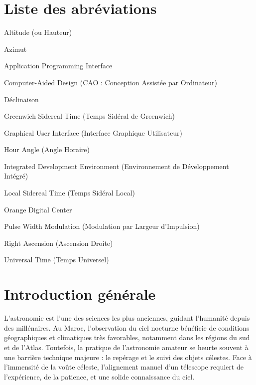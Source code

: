 \documentclass[12pt,a4paper]{report}
\begin{document}
\chapter*{Liste des abréviations}
\begin{description}[font=\bfseries, labelwidth=2.5cm, leftmargin=3cm]
    \item[Alt] Altitude (ou Hauteur)
    \item[Az] Azimut
    \item[API] Application Programming Interface
    \item[CAD] Computer-Aided Design (CAO : Conception Assistée par Ordinateur)
    \item[Dec] Déclinaison
    \item[GST] Greenwich Sidereal Time (Temps Sidéral de Greenwich)
    \item[GUI] Graphical User Interface (Interface Graphique Utilisateur)
    \item[HA] Hour Angle (Angle Horaire)
    \item[IDE] Integrated Development Environment (Environnement de Développement Intégré)
    \item[LST] Local Sidereal Time (Temps Sidéral Local)
    \item[ODC] Orange Digital Center
    \item[PWM] Pulse Width Modulation (Modulation par Largeur d'Impulsion)
    \item[RA] Right Ascension (Ascension Droite)
    \item[UT] Universal Time (Temps Universel)
\end{description}

\clearpage

\tableofcontents
\clearpage
\listoffigures
{}
\clearpage
\listoftables
{}
\clearpage


\chapter*{Introduction générale}
L'astronomie est l'une des sciences les plus anciennes, guidant l'humanité depuis des millénaires. Au Maroc, l'observation du ciel nocturne bénéficie de conditions géographiques et climatiques très favorables, notamment dans les régions du sud et de l'Atlas. Toutefois, la pratique de l'astronomie amateur se heurte souvent à une barrière technique majeure : le repérage et le suivi des objets célestes. Face à l'immensité de la voûte céleste, l'alignement manuel d'un télescope requiert de l'expérience, de la patience, et une solide connaissance du ciel.
\end{document}
